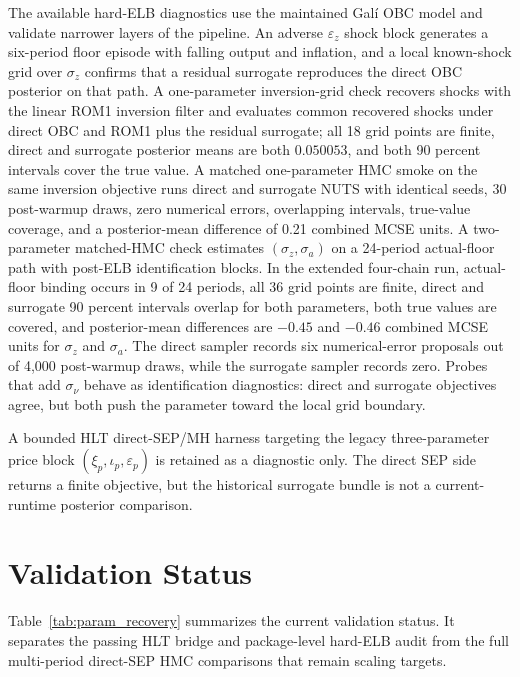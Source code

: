 \documentclass[12pt]{article}
\theoremstyle{plain}
\theoremstyle{definition}
\theoremstyle{remark}
\newcommand{\eps}{\varepsilon}
\begin{document}
The available hard-ELB diagnostics use the maintained Gal\'i OBC model and validate narrower layers of the pipeline. An adverse $\eps_z$ shock block generates a six-period floor episode with falling output and inflation, and a local known-shock grid over $\sigma_z$ confirms that a residual surrogate reproduces the direct OBC posterior on that path. A one-parameter inversion-grid check recovers shocks with the linear ROM1 inversion filter and evaluates common recovered shocks under direct OBC and ROM1 plus the residual surrogate; all 18 grid points are finite, direct and surrogate posterior means are both $0.050053$, and both 90 percent intervals cover the true value. A matched one-parameter HMC smoke on the same inversion objective runs direct and surrogate NUTS with identical seeds, 30 post-warmup draws, zero numerical errors, overlapping intervals, true-value coverage, and a posterior-mean difference of 0.21 combined MCSE units. A two-parameter matched-HMC check estimates $(\sigma_z,\sigma_a)$ on a 24-period actual-floor path with post-ELB identification blocks. In the extended four-chain run, actual-floor binding occurs in 9 of 24 periods, all 36 grid points are finite, direct and surrogate 90 percent intervals overlap for both parameters, both true values are covered, and posterior-mean differences are $-0.45$ and $-0.46$ combined MCSE units for $\sigma_z$ and $\sigma_a$. The direct sampler records six numerical-error proposals out of 4,000 post-warmup draws, while the surrogate sampler records zero. Probes that add $\sigma_\nu$ behave as identification diagnostics: direct and surrogate objectives agree, but both push the parameter toward the local grid boundary.

A bounded HLT direct-SEP/MH harness targeting the legacy three-parameter price block $(\xi_p,\iota_p,\varepsilon_p)$ is retained as a diagnostic only. The direct SEP side returns a finite objective, but the historical surrogate bundle is not a current-runtime posterior comparison.

\section{Validation Status}
\label{app:validation_results}

Table~\ref{tab:param_recovery} summarizes the current validation status. It separates the passing HLT bridge and package-level hard-ELB audit from the full multi-period direct-SEP HMC comparisons that remain scaling targets.
\end{document}
